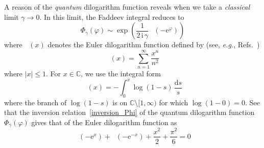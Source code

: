 \documentclass[12pt,reqno]{amsart}
\numberwithin{equation}{section}
\DeclareMathOperator{\Li}{Li_2}
\newcommand{\I}{\mathrm{i}}
\newcommand{\E}{\mathrm{e}}
\begin{document}
A reason of the \emph{quantum} dilogarithm function reveals when
we take a \emph{classical} limit $\gamma\to 0$.
In this limit, the Faddeev integral reduces to
\begin{equation}
  \label{Phi_gamma_0}
  \Phi_\gamma(\varphi)
  \sim
  \exp
  \left(
    \frac{1}{2 \,  \I \, \gamma} \,
    \Li(- \E^\varphi)
  \right) 
%
\end{equation}
where $\Li(x)$ denotes the Euler dilogarithm function defined by
(see, \emph{e.g.}, Refs.~)
\begin{equation}
  \label{Euler_dilogarithm}
  \Li(x)
  =
  \sum_{n=1}^\infty \frac{x^n}{n^2} 
\end{equation}
where $|x| \leq 1$.
For $x \in \mathbb{C}$, we use the integral form
\begin{equation*}
  \Li(x) =
  -
  \int_0^x  \log(1-s)  \, \frac{\mathrm{d} s}{s} 
\end{equation*}
where the branch of $\log(1-s)$ is on
 $\mathbb{C}\setminus [ 1, \infty)$
for which $\log(1-0)=0$.
See that the inversion relation~\eqref{inversion_Phi} of the quantum
dilogarithm function $\Phi_\gamma(\varphi)$ gives that of the Euler
dilogarithm function as
  \begin{equation*}
    \Li(- \E^x) + \Li(-\E^{-x})
    +
    \frac{x^2}{2} + \frac{\pi^2}{6} = 0 
  \end{equation*}
\end{document}
